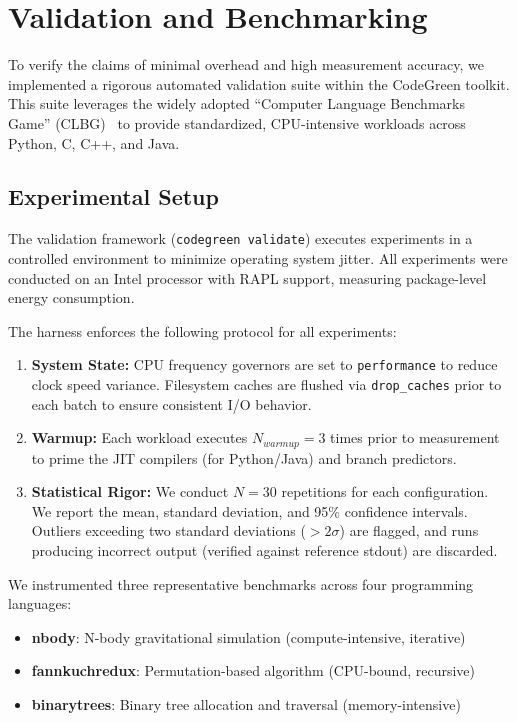 \section{Validation and Benchmarking}
\label{sec:validation}

To verify the claims of minimal overhead and high measurement accuracy, we implemented a rigorous automated validation suite within the CodeGreen toolkit. This suite leverages the widely adopted ``Computer Language Benchmarks Game'' (CLBG)~\cite{gouy2018benchmarks} to provide standardized, CPU-intensive workloads across Python, C, C++, and Java.

\subsection{Experimental Setup}

The validation framework (\texttt{codegreen validate}) executes experiments in a controlled environment to minimize operating system jitter. All experiments were conducted on an Intel processor with RAPL support, measuring package-level energy consumption.

The harness enforces the following protocol for all experiments:
\begin{enumerate}
    \item \textbf{System State:} CPU frequency governors are set to \texttt{performance} to reduce clock speed variance. Filesystem caches are flushed via \texttt{drop\_caches} prior to each batch to ensure consistent I/O behavior.
    \item \textbf{Warmup:} Each workload executes $N_{warmup}=3$ times prior to measurement to prime the JIT compilers (for Python/Java) and branch predictors.
    \item \textbf{Statistical Rigor:} We conduct $N=30$ repetitions for each configuration. We report the mean, standard deviation, and 95\% confidence intervals. Outliers exceeding two standard deviations ($>2\sigma$) are flagged, and runs producing incorrect output (verified against reference stdout) are discarded.
\end{enumerate}

We instrumented three representative benchmarks across four programming languages:
\begin{itemize}
    \item \textbf{nbody}: N-body gravitational simulation (compute-intensive, iterative)
    \item \textbf{fannkuchredux}: Permutation-based algorithm (CPU-bound, recursive)
    \item \textbf{binarytrees}: Binary tree allocation and traversal (memory-intensive)
\end{itemize}

